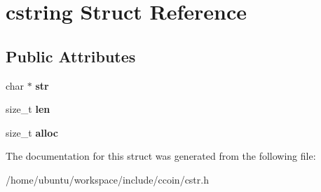 \hypertarget{structcstring}{\section{cstring Struct Reference}
\label{structcstring}
}
\subsection*{Public Attributes}
\begin{DoxyCompactItemize}
\item 
\hypertarget{structcstring_a731cdf51b981dfd0c66713e2c942a43d}{char $\ast$ {\bfseries str}}\label{structcstring_a731cdf51b981dfd0c66713e2c942a43d}

\item 
\hypertarget{structcstring_ad0eb3a0fea291824cc3a7176a4d6a345}{size\-\_\-t {\bfseries len}}\label{structcstring_ad0eb3a0fea291824cc3a7176a4d6a345}

\item 
\hypertarget{structcstring_a5d0c6d93ac71cc14384bcf732ea07092}{size\-\_\-t {\bfseries alloc}}\label{structcstring_a5d0c6d93ac71cc14384bcf732ea07092}

\end{DoxyCompactItemize}


The documentation for this struct was generated from the following file\-:\begin{DoxyCompactItemize}
\item 
/home/ubuntu/workspace/include/ccoin/cstr.\-h\end{DoxyCompactItemize}
